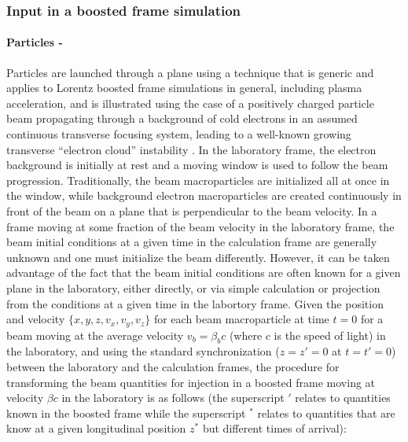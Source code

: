 \subsubsection{Input in a boosted frame simulation}
\paragraph{Particles - }
Particles are launched through a plane using a technique that is generic and applies to Lorentz boosted frame simulations in general, including plasma acceleration, and is illustrated using the case of a positively charged particle beam propagating through a background of cold electrons in an assumed continuous transverse focusing system, leading to a well-known growing transverse ``electron cloud'' instability  \cite{Vayprl07}. In the laboratory frame, the electron background is initially at rest and a moving window is used to follow the beam progression. Traditionally, the beam macroparticles are initialized all at once in the window, while background electron macroparticles are created continuously in front of the beam on a plane that is perpendicular to the beam velocity. In a frame moving at some fraction of the beam velocity in the laboratory frame, the beam initial conditions at a given time in the calculation frame are generally unknown and one must initialize the beam differently. However, it can be taken advantage of the fact that the beam initial conditions are often known for a given plane in the laboratory, either directly, or via simple calculation or projection from the conditions at a given time in the labortory frame. Given the position and velocity $\{x,y,z,v_x,v_y,v_z\}$ for each beam macroparticle at time $t=0$ for a beam moving at the average velocity $v_b=\beta_b c$ (where $c$ is the speed of light) in the laboratory, and using the standard synchronization ($z=z'=0$ at $t=t'=0$) between the laboratory and the calculation frames, the procedure for transforming the beam quantities for injection in a boosted frame moving at velocity $\beta c$ in the laboratory is as follows (the superscript $'$ relates to quantities known in the boosted frame while the superscript $^*$ relates to quantities that are know at a given longitudinal position $z^*$ but different times of arrival):

